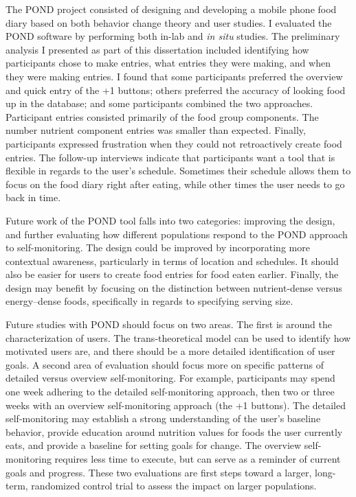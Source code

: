 The POND project consisted of designing and developing a mobile phone food diary based on both behavior change theory and user studies. I evaluated the POND software by performing both in-lab and \textit{in situ} studies. The preliminary analysis I presented as part of this dissertation included identifying how participants chose to make entries, what entries they were making, and when they were making entries. I found that some participants preferred the overview and quick entry of the +1 buttons; others preferred the accuracy of looking food up in the database; and some participants combined the two approaches. Participant entries consisted primarily of the food group components. The number nutrient component entries was smaller than expected. Finally, participants expressed frustration when they could not retroactively create food entries. The follow-up interviews indicate that participants want a tool that is flexible in regards to the user's schedule. Sometimes their schedule allows them to focus on the food diary right after eating, while other times the user needs to go back in time. 

Future work of the POND tool falls into two categories: improving the design, and further evaluating how different populations respond to the POND approach to self-monitoring. The design could be improved by incorporating more contextual awareness, particularly in terms of location and schedules. It should also be easier for users to create food entries for food eaten earlier. Finally, the design may benefit by focusing on the distinction between nutrient-dense versus energy--dense foods, specifically in regards to specifying serving size. 

Future studies with POND should focus on two areas. The first is around the characterization of users. The trans-theoretical model can be used to identify how motivated users are, and there should be a more detailed identification of user goals. A second area of evaluation should focus more on specific patterns of detailed versus overview self-monitoring. For example, participants may spend one week adhering to the detailed self-monitoring approach, then two or three weeks with an overview self-monitoring approach (the +1 buttons).  The detailed self-monitoring may establish a strong understanding of the user's baseline behavior, provide education around nutrition values for foods the user currently eats, and provide a baseline for setting goals for change. The overview self-monitoring requires less time to execute, but can serve as a reminder of current goals and progress. These two evaluations are first steps toward a larger, long-term, randomized control trial to assess the impact on larger populations. 

